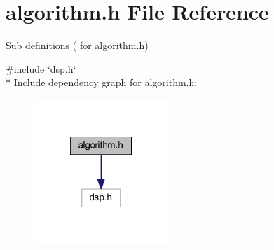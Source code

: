 \hypertarget{a00021}{\section{algorithm.\+h File Reference}
\label{a00021}
}


Sub definitions ( for \hyperlink{a00021}{algorithm.\+h})  


{\ttfamily \#include \char`\"{}dsp.\+h\char`\"{}}\\*
Include dependency graph for algorithm.\+h\+:\nopagebreak
\begin{figure}[H]
\begin{center}
\leavevmode
\includegraphics[width=145pt]{d1/de7/a00877}
\end{center}
\end{figure}
